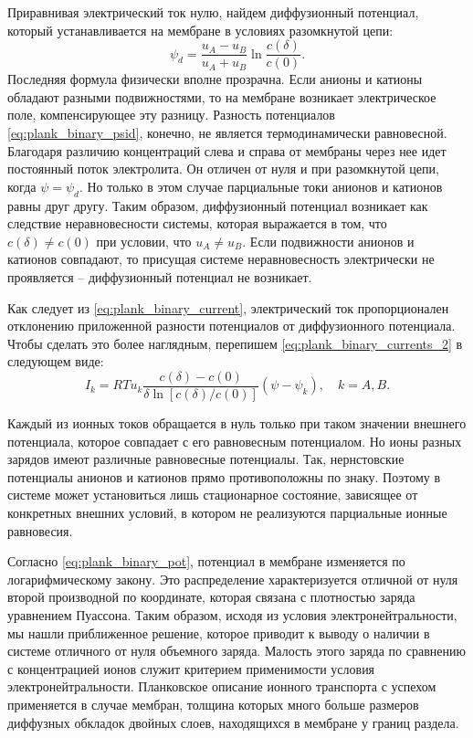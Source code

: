 Приравнивая электрический ток нулю, найдем диффузионный потенциал, который
устанавливается на мембране в условиях разомкнутой цепи:
\begin{equation}
    \psi_d = \frac{u_A - u_B}{u_A + u_B}\ln\frac{c(\delta)}{c(0)}.
    \label{eq:plank_binary_psid}
\end{equation}
Последняя формула физически вполне прозрачна. Если анионы и катионы обладают
разными подвижностями, то на мембране возникает электрическое поле,
компенсирующее эту разницу. Разность потенциалов \eqref{eq:plank_binary_psid},
конечно, не является термодинамически равновесной. Благодаря различию
концентраций слева и справа от мембраны через нее идет постоянный поток
электролита. Он отличен от нуля и при разомкнутой цепи, когда
\( \psi = \psi_d \). Но только в этом случае парциальные токи анионов и катионов
равны друг другу. Таким образом, диффузионный потенциал возникает как следствие
неравновесности системы, которая выражается в том, что \( c(\delta) \neq c(0) \)
при условии, что \( u_A \neq u_B \). Если подвижности анионов и катионов
совпадают, то присущая системе неравновесность электрически не проявляется --
диффузионный потенциал не возникает.

Как следует из \eqref{eq:plank_binary_current}, электрический ток
пропорционален отклонению приложенной разности потенциалов от диффузионного
потенциала. Чтобы сделать это более наглядным, перепишем
\eqref{eq:plank_binary_currents_2} в следующем виде:
\begin{equation}
    I_k = RTu_k\frac{c(\delta) - c(0)}{\delta\ln[c(\delta)/c(0)]}(\psi-\psi_k),
    \quad k = A,B.
\end{equation}

Каждый из ионных токов обращается в нуль только при таком значении внешнего
потенциала, которое совпадает с его равновесным потенциалом. Но ионы разных
зарядов имеют различные равновесные потенциалы. Так, нернстовские потенциалы
анионов и катионов прямо противоположны по знаку. Поэтому в системе может
установиться лишь стационарное состояние, зависящее от конкретных внешних
условий, в котором не реализуются парциальные ионные равновесия.

Согласно \eqref{eq:plank_binary_pot}, потенциал в мембране изменяется по
логарифмическому закону. Это распределение характеризуется отличной от нуля
второй производной по координате, которая связана с плотностью заряда уравнением
Пуассона. Таким образом, исходя из условия электронейтральности, мы нашли
приближенное решение, которое приводит к выводу о наличии в системе отличного от
нуля объемного заряда. Малость этого заряда по сравнению с концентрацией ионов
служит критерием применимости условия электронейтральности. Планковское описание
ионного транспорта с успехом применяется в случае мембран, толщина которых много
больше размеров диффузных обкладок двойных слоев, находящихся в мембране у
границ раздела.

